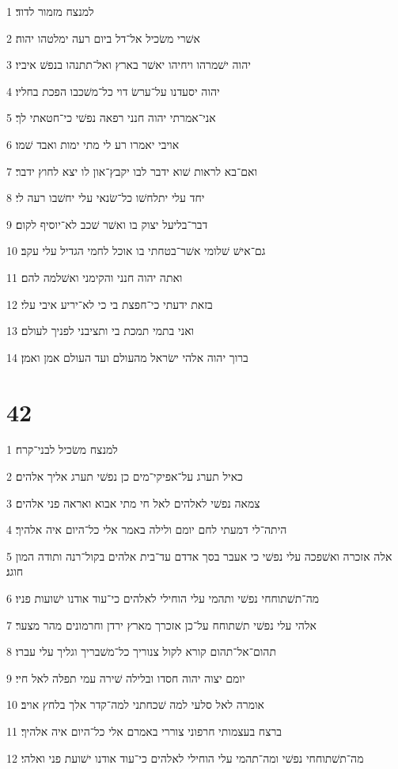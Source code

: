 \par 1 למנצח מזמור לדוד׃
\par 2 אשׁרי משׂכיל אל־דל ביום רעה ימלטהו יהוה׃
\par 3 יהוה ישׁמרהו ויחיהו יאשׁר בארץ ואל־תתנהו בנפשׁ איביו׃
\par 4 יהוה יסעדנו על־ערשׂ דוי כל־משׁכבו הפכת בחליו׃
\par 5 אני־אמרתי יהוה חנני רפאה נפשׁי כי־חטאתי לך׃
\par 6 אויבי יאמרו רע לי מתי ימות ואבד שׁמו׃
\par 7 ואם־בא לראות שׁוא ידבר לבו יקבץ־און לו יצא לחוץ ידבר׃
\par 8 יחד עלי יתלחשׁו כל־שׂנאי עלי יחשׁבו רעה לי׃
\par 9 דבר־בליעל יצוק בו ואשׁר שׁכב לא־יוסיף לקום׃
\par 10 גם־אישׁ שׁלומי אשׁר־בטחתי בו אוכל לחמי הגדיל עלי עקב׃
\par 11 ואתה יהוה חנני והקימני ואשׁלמה להם׃
\par 12 בזאת ידעתי כי־חפצת בי כי לא־יריע איבי עלי׃
\par 13 ואני בתמי תמכת בי ותציבני לפניך לעולם׃
\par 14 ברוך יהוה אלהי ישׂראל מהעולם ועד העולם אמן ואמן׃

\chapter{42}

\par 1 למנצח משׂכיל לבני־קרח׃
\par 2 כאיל תערג על־אפיקי־מים כן נפשׁי תערג אליך אלהים׃
\par 3 צמאה נפשׁי לאלהים לאל חי מתי אבוא ואראה פני אלהים׃
\par 4 היתה־לי דמעתי לחם יומם ולילה באמר אלי כל־היום איה אלהיך׃
\par 5 אלה אזכרה ואשׁפכה עלי נפשׁי כי אעבר בסך אדדם עד־בית אלהים בקול־רנה ותודה המון חוגג׃
\par 6 מה־תשׁתוחחי נפשׁי ותהמי עלי הוחילי לאלהים כי־עוד אודנו ישׁועות פניו׃
\par 7 אלהי עלי נפשׁי תשׁתוחח על־כן אזכרך מארץ ירדן וחרמונים מהר מצער׃
\par 8 תהום־אל־תהום קורא לקול צנוריך כל־משׁבריך וגליך עלי עברו׃
\par 9 יומם יצוה יהוה חסדו ובלילה שׁירה עמי תפלה לאל חיי׃
\par 10 אומרה לאל סלעי למה שׁכחתני למה־קדר אלך בלחץ אויב׃
\par 11 ברצח בעצמותי חרפוני צוררי באמרם אלי כל־היום איה אלהיך׃
\par 12 מה־תשׁתוחחי נפשׁי ומה־תהמי עלי הוחילי לאלהים כי־עוד אודנו ישׁועת פני ואלהי׃

